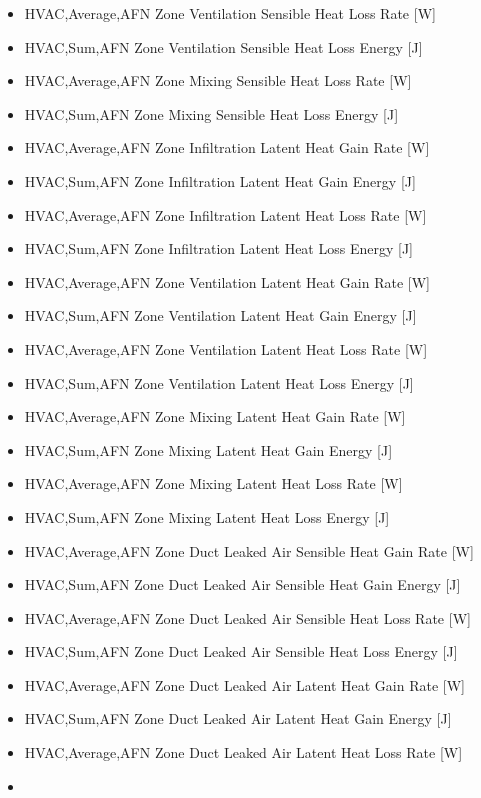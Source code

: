 \begin{itemize}
\item
  HVAC,Average,AFN Zone Ventilation Sensible Heat Loss Rate {[}W{]}
\item
  HVAC,Sum,AFN Zone Ventilation Sensible Heat Loss Energy {[}J{]}
\item
  HVAC,Average,AFN Zone Mixing Sensible Heat Loss Rate {[}W{]}
\item
  HVAC,Sum,AFN Zone Mixing Sensible Heat Loss Energy {[}J{]}
\item
  HVAC,Average,AFN Zone Infiltration Latent Heat Gain Rate {[}W{]}
\item
  HVAC,Sum,AFN Zone Infiltration Latent Heat Gain Energy {[}J{]}
\item
  HVAC,Average,AFN Zone Infiltration Latent Heat Loss Rate {[}W{]}
\item
  HVAC,Sum,AFN Zone Infiltration Latent Heat Loss Energy {[}J{]}
\item
  HVAC,Average,AFN Zone Ventilation Latent Heat Gain Rate {[}W{]}
\item
  HVAC,Sum,AFN Zone Ventilation Latent Heat Gain Energy {[}J{]}
\item
  HVAC,Average,AFN Zone Ventilation Latent Heat Loss Rate {[}W{]}
\item
  HVAC,Sum,AFN Zone Ventilation Latent Heat Loss Energy {[}J{]}
\item
  HVAC,Average,AFN Zone Mixing Latent Heat Gain Rate {[}W{]}
\item
  HVAC,Sum,AFN Zone Mixing Latent Heat Gain Energy {[}J{]}
\item
  HVAC,Average,AFN Zone Mixing Latent Heat Loss Rate {[}W{]}
\item
  HVAC,Sum,AFN Zone Mixing Latent Heat Loss Energy {[}J{]}
\item
  HVAC,Average,AFN Zone Duct Leaked Air Sensible Heat Gain Rate {[}W{]}
\item
  HVAC,Sum,AFN Zone Duct Leaked Air Sensible Heat Gain Energy {[}J{]}
\item
  HVAC,Average,AFN Zone Duct Leaked Air Sensible Heat Loss Rate {[}W{]}
\item
  HVAC,Sum,AFN Zone Duct Leaked Air Sensible Heat Loss Energy {[}J{]}
\item
  HVAC,Average,AFN Zone Duct Leaked Air Latent Heat Gain Rate {[}W{]}
\item
  HVAC,Sum,AFN Zone Duct Leaked Air Latent Heat Gain Energy {[}J{]}
\item
  HVAC,Average,AFN Zone Duct Leaked Air Latent Heat Loss Rate {[}W{]}
\item

\end{itemize}
